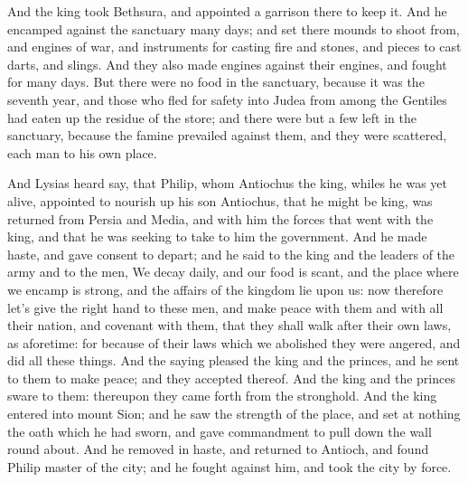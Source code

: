 {And the king took Bethsura, and appointed a garrison there to keep it.
And he encamped against the sanctuary many days; and set there mounds to shoot from, and engines of war, and instruments for casting fire and stones, and pieces to cast darts, and slings.
And they also made engines against their engines, and fought for many days.
But there were no food in the sanctuary, because it was the seventh year, and those who fled for safety into Judea from among the Gentiles had eaten up the residue of the store;
and there were but a few left in the sanctuary, because the famine prevailed against them, and they were scattered, each man to his own place.
\par }{\PP {}And Lysias heard say, that Philip, whom Antiochus the king, whiles he was yet alive, appointed to nourish up his son Antiochus, that he might be king,
was returned from Persia and Media, and with him the forces that went with the king, and that he was seeking to take to him the government.
And he made haste, and gave consent to depart; and he said to the king and the leaders of the army and to the men, We decay daily, and our food is scant, and the place where we encamp is strong, and the affairs of the kingdom lie upon us:
now therefore let’s give the right hand to these men, and make peace with them and with all their nation,
and covenant with them, that they shall walk after their own laws, as aforetime: for because of their laws which we abolished they were angered, and did all these things.
And the saying pleased the king and the princes, and he sent to them to make peace; and they accepted thereof.
And the king and the princes sware to them: thereupon they came forth from the stronghold.
And the king entered into mount Sion; and he saw the strength of the place, and set at nothing the oath which he had sworn, and gave commandment to pull down the wall round about.
And he removed in haste, and returned to Antioch, and found Philip master of the city; and he fought against him, and took the city by force.

}
